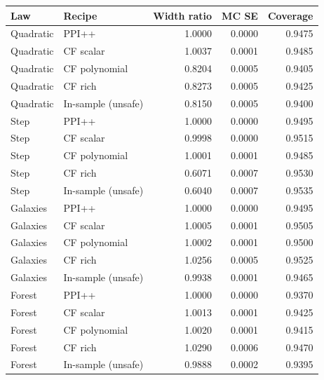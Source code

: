 \begin{tabular}{llrrr}
\toprule
Law & Recipe & Width ratio & MC SE & Coverage \\
\midrule
Quadratic & PPI++ & 1.0000 & 0.0000 & 0.9475 \\
Quadratic & CF scalar & 1.0037 & 0.0001 & 0.9485 \\
Quadratic & CF polynomial & 0.8204 & 0.0005 & 0.9405 \\
Quadratic & CF rich & 0.8273 & 0.0005 & 0.9425 \\
Quadratic & In-sample (unsafe) & 0.8150 & 0.0005 & 0.9400 \\
Step & PPI++ & 1.0000 & 0.0000 & 0.9495 \\
Step & CF scalar & 0.9998 & 0.0000 & 0.9515 \\
Step & CF polynomial & 1.0001 & 0.0001 & 0.9485 \\
Step & CF rich & 0.6071 & 0.0007 & 0.9530 \\
Step & In-sample (unsafe) & 0.6040 & 0.0007 & 0.9535 \\
Galaxies & PPI++ & 1.0000 & 0.0000 & 0.9495 \\
Galaxies & CF scalar & 1.0005 & 0.0001 & 0.9505 \\
Galaxies & CF polynomial & 1.0002 & 0.0001 & 0.9500 \\
Galaxies & CF rich & 1.0256 & 0.0005 & 0.9525 \\
Galaxies & In-sample (unsafe) & 0.9938 & 0.0001 & 0.9465 \\
Forest & PPI++ & 1.0000 & 0.0000 & 0.9370 \\
Forest & CF scalar & 1.0013 & 0.0001 & 0.9425 \\
Forest & CF polynomial & 1.0020 & 0.0001 & 0.9415 \\
Forest & CF rich & 1.0290 & 0.0006 & 0.9470 \\
Forest & In-sample (unsafe) & 0.9888 & 0.0002 & 0.9395 \\
\bottomrule
\end{tabular}
